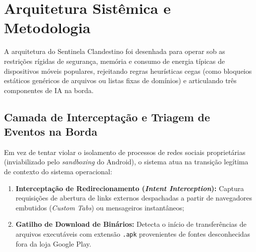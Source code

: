 \section{Arquitetura Sist\^{e}mica e Metodologia}
\label{sec:arquitetura}

A arquitetura do Sentinela Clandestino foi desenhada para operar sob as restri\c{c}\~{o}es r\'{i}gidas de seguran\c{c}a, mem\'{o}ria e consumo de energia t\'{i}picas de dispositivos m\'{o}veis populares, rejeitando regras heur\'{i}sticas cegas (como bloqueios est\'{a}ticos gen\'{e}ricos de arquivos ou listas fixas de dom\'{i}nios) e articulando tr\^{e}s componentes de IA na borda.

\subsection{Camada de Intercepta\c{c}\~{a}o e Triagem de Eventos na Borda}
Em vez de tentar violar o isolamento de processos de redes sociais propriet\'{a}rias (inviabilizado pelo \textit{sandboxing} do Android), o sistema atua na transi\c{c}\~{a}o leg\'{i}tima de contexto do sistema operacional:
\begin{enumerate}
    \item \textbf{Intercepta\c{c}\~{a}o de Redirecionamento (\textit{Intent Interception}):} Captura requisi\c{c}\~{o}es de abertura de links externos despachadas a partir de navegadores embutidos (\textit{Custom Tabs}) ou mensageiros instant\^{a}neos;
    \item \textbf{Gatilho de Download de Bin\'{a}rios:} Detecta o in\'{i}cio de transfer\^{e}ncias de arquivos execut\'{a}veis com extens\~{a}o \texttt{.apk} provenientes de fontes desconhecidas fora da loja Google Play.
\end{enumerate}

